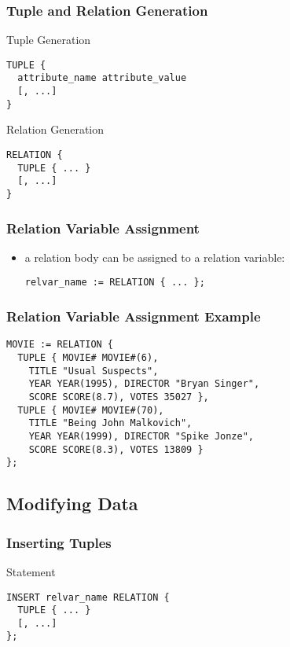 \documentclass[dvipsnames]{beamer}
\theoremstyle{plain}
\begin{document}
\begin{frame}[fragile]
  \frametitle{Tuple and Relation Generation}

  \begin{block}{Tuple Generation}
    \begin{lstlisting}
TUPLE {
  attribute_name attribute_value
  [, ...]
}
    \end{lstlisting}
  \end{block}

  \pause
  \begin{block}{Relation Generation}
    \begin{lstlisting}
RELATION {
  TUPLE { ... }
  [, ...]
}
    \end{lstlisting}
  \end{block}
\end{frame}

\begin{frame}[fragile]
  \frametitle{Relation Variable Assignment}

  \begin{itemize}
    \item a relation body can be assigned to a relation variable:
    \begin{lstlisting}
relvar_name := RELATION { ... };
    \end{lstlisting}
  \end{itemize}
\end{frame}

\begin{frame}[fragile]
  \frametitle{Relation Variable Assignment Example}

  \begin{example}
    \begin{lstlisting}
MOVIE := RELATION {
  TUPLE { MOVIE# MOVIE#(6),
    TITLE "Usual Suspects",
    YEAR YEAR(1995), DIRECTOR "Bryan Singer",
    SCORE SCORE(8.7), VOTES 35027 },
  TUPLE { MOVIE# MOVIE#(70),
    TITLE "Being John Malkovich",
    YEAR YEAR(1999), DIRECTOR "Spike Jonze",
    SCORE SCORE(8.3), VOTES 13809 }
};
    \end{lstlisting}
  \end{example}
\end{frame}

\subsection{Modifying Data}

\begin{frame}[fragile]
  \frametitle{Inserting Tuples}

  \begin{block}{Statement}
    \begin{lstlisting}
INSERT relvar_name RELATION {
  TUPLE { ... }
  [, ...]
};
    \end{lstlisting}
  \end{block}
\end{frame}
\end{document}
